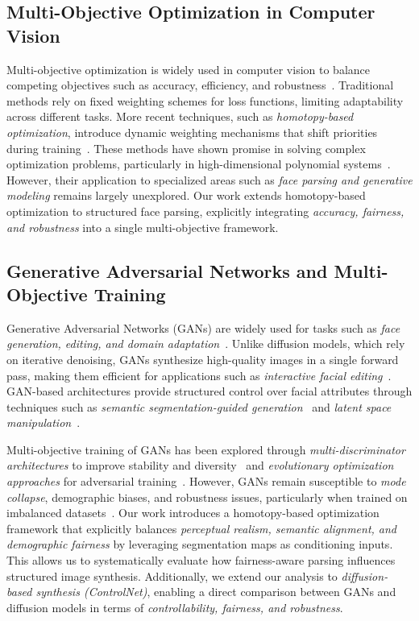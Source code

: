 \subsection{Multi-Objective Optimization in Computer Vision}
Multi-objective optimization is widely used in computer vision to balance competing objectives such as accuracy, efficiency, and robustness~\cite{sharma2022comprehensive}. Traditional methods rely on fixed weighting schemes for loss functions, limiting adaptability across different tasks. More recent techniques, such as \textit{homotopy-based optimization}, introduce dynamic weighting mechanisms that shift priorities during training~\cite{chien2022gpu}. These methods have shown promise in solving complex optimization problems, particularly in high-dimensional polynomial systems~\cite{morgan1987computing}. However, their application to specialized areas such as \textit{face parsing and generative modeling} remains largely unexplored. Our work extends homotopy-based optimization to structured face parsing, explicitly integrating \textit{accuracy, fairness, and robustness} into a single multi-objective framework.

\subsection{Generative Adversarial Networks and Multi-Objective Training}
Generative Adversarial Networks (GANs) are widely used for tasks such as \textit{face generation, editing, and domain adaptation}~\cite{goodfellow2014generative}. Unlike diffusion models, which rely on iterative denoising, GANs synthesize high-quality images in a single forward pass, making them efficient for applications such as \textit{interactive facial editing}~\cite{karras2020analyzing}. GAN-based architectures provide structured control over facial attributes through techniques such as \textit{semantic segmentation-guided generation}~\cite{park2019semantic} and \textit{latent space manipulation}~\cite{wu2021stylespace}. 

Multi-objective training of GANs has been explored through \textit{multi-discriminator architectures} to improve stability and diversity~\cite{albuquerque2019multi} and \textit{evolutionary optimization approaches} for adversarial training~\cite{wang2019evolutionary}. However, GANs remain susceptible to \textit{mode collapse}, demographic biases, and robustness issues, particularly when trained on imbalanced datasets~\cite{tan2020improving}. Our work introduces a homotopy-based optimization framework that explicitly balances \textit{perceptual realism, semantic alignment, and demographic fairness} by leveraging segmentation maps as conditioning inputs. This allows us to systematically evaluate how fairness-aware parsing influences structured image synthesis. Additionally, we extend our analysis to \textit{diffusion-based synthesis (ControlNet)}, enabling a direct comparison between GANs and diffusion models in terms of \textit{controllability, fairness, and robustness}.


